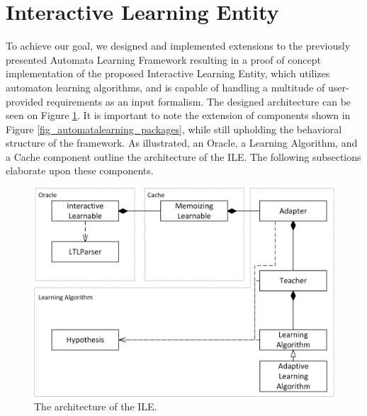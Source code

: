 \smallskip

\section{Interactive Learning Entity} \label{sec_interactivelearningframework}

To achieve our goal, we designed and implemented extensions to the previously presented Automata Learning Framework resulting in a proof of concept implementation of the proposed Interactive Learning Entity, which utilizes automaton learning algorithms, and is capable of handling a multitude of user-provided requirements as an input formalism. The designed architecture can be seen on Figure \ref{fig_automatonlearning_overview}. It is important to note the extension of components shown in Figure \ref{fig_automatalearning_packages}, while still upholding the behavioral structure of the framework. As illustrated, an Oracle, a Learning Algorithm, and a Cache component outline the architecture of the ILE. The following subsections elaborate upon these components.

\begin{figure}[H] 
	\centering
	\includegraphics[width=120mm, keepaspectratio]{figures/automatalearning_overview.png}
	\caption{The architecture of the ILE.} 
	\label{fig_automatonlearning_overview}
\end{figure}

